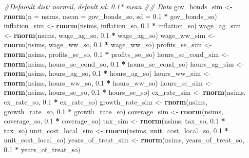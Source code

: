 \documentclass[]{article}
\newenvironment{Shaded}{\begin{snugshade}}{\end{snugshade}}
\newcommand{\CommentTok}[1]{\textcolor[rgb]{0.56,0.35,0.01}{\textit{#1}}}
\newcommand{\DataTypeTok}[1]{\textcolor[rgb]{0.13,0.29,0.53}{#1}}
\newcommand{\FloatTok}[1]{\textcolor[rgb]{0.00,0.00,0.81}{#1}}
\newcommand{\KeywordTok}[1]{\textcolor[rgb]{0.13,0.29,0.53}{\textbf{#1}}}
\newcommand{\NormalTok}[1]{#1}
\newcommand{\OperatorTok}[1]{\textcolor[rgb]{0.81,0.36,0.00}{\textbf{#1}}}
\newcommand{\StringTok}[1]{\textcolor[rgb]{0.31,0.60,0.02}{#1}}
\begin{document}
\begin{Shaded}
\begin{Highlighting}[]
{\CommentTok{#Defaoult dist: normal, default sd: 0.1* mean}
\CommentTok{## Data }
\NormalTok{gov_bonds_sim <-}\StringTok{        }\KeywordTok{rnorm}\NormalTok{(}\DataTypeTok{n =}\NormalTok{ nsims, }\DataTypeTok{mean =}\NormalTok{ gov_bonds_so, }\DataTypeTok{sd =} \FloatTok{0.1} \OperatorTok{*}\StringTok{ }\NormalTok{gov_bonds_so)  }
\NormalTok{inflation_sim <-}\StringTok{        }\KeywordTok{rnorm}\NormalTok{(nsims, inflation_so, }\FloatTok{0.1} \OperatorTok{*}\StringTok{ }\NormalTok{inflation_so)}
\NormalTok{wage_ag_sim <-}\StringTok{          }\KeywordTok{rnorm}\NormalTok{(nsims, wage_ag_so, }\FloatTok{0.1} \OperatorTok{*}\StringTok{ }\NormalTok{wage_ag_so)}
\NormalTok{wage_ww_sim <-}\StringTok{          }\KeywordTok{rnorm}\NormalTok{(nsims, wage_ww_so, }\FloatTok{0.1} \OperatorTok{*}\StringTok{ }\NormalTok{wage_ww_so)}
\NormalTok{profits_se_sim <-}\StringTok{       }\KeywordTok{rnorm}\NormalTok{(nsims, profits_se_so, }\FloatTok{0.1} \OperatorTok{*}\StringTok{ }\NormalTok{profits_se_so)}
\NormalTok{hours_se_cond_sim <-}\StringTok{    }\KeywordTok{rnorm}\NormalTok{(nsims, hours_se_cond_so, }\FloatTok{0.1} \OperatorTok{*}\StringTok{ }\NormalTok{hours_se_cond_so)}
\NormalTok{hours_ag_sim <-}\StringTok{         }\KeywordTok{rnorm}\NormalTok{(nsims, hours_ag_so, }\FloatTok{0.1} \OperatorTok{*}\StringTok{ }\NormalTok{hours_ag_so)}
\NormalTok{hours_ww_sim <-}\StringTok{         }\KeywordTok{rnorm}\NormalTok{(nsims, hours_ww_so, }\FloatTok{0.1} \OperatorTok{*}\StringTok{ }\NormalTok{hours_ww_so)}
\NormalTok{hours_se_sim <-}\StringTok{         }\KeywordTok{rnorm}\NormalTok{(nsims, hours_se_so, }\FloatTok{0.1} \OperatorTok{*}\StringTok{ }\NormalTok{hours_se_so)}
\NormalTok{ex_rate_sim <-}\StringTok{          }\KeywordTok{rnorm}\NormalTok{(nsims, ex_rate_so, }\FloatTok{0.1} \OperatorTok{*}\StringTok{ }\NormalTok{ex_rate_so)}
\NormalTok{growth_rate_sim <-}\StringTok{      }\KeywordTok{rnorm}\NormalTok{(nsims, growth_rate_so, }\FloatTok{0.1} \OperatorTok{*}\StringTok{ }\NormalTok{growth_rate_so)}
\NormalTok{coverage_sim <-}\StringTok{         }\KeywordTok{rnorm}\NormalTok{(nsims, coverage_so, }\FloatTok{0.1} \OperatorTok{*}\StringTok{ }\NormalTok{coverage_so)}
\NormalTok{tax_sim <-}\StringTok{              }\KeywordTok{rnorm}\NormalTok{(nsims, tax_so, }\FloatTok{0.1} \OperatorTok{*}\StringTok{ }\NormalTok{tax_so)}
\NormalTok{unit_cost_local_sim <-}\StringTok{  }\KeywordTok{rnorm}\NormalTok{(nsims, unit_cost_local_so, }\FloatTok{0.1} \OperatorTok{*}\StringTok{ }\NormalTok{unit_cost_local_so)}
\NormalTok{years_of_treat_sim <-}\StringTok{   }\KeywordTok{rnorm}\NormalTok{(nsims, years_of_treat_so, }\FloatTok{0.1} \OperatorTok{*}\StringTok{ }\NormalTok{years_of_treat_so)}

}
\end{Highlighting}
\end{Shaded}
\end{document}
